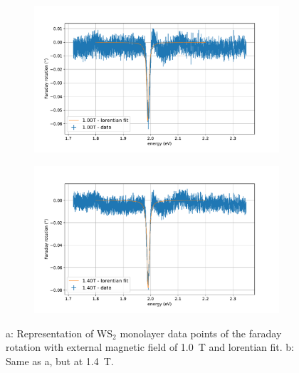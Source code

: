 \begin{figure}[H]
    \centering
    \begin{subfigure}{0.47\textwidth}
        \centering
        \includegraphics[width=1.0\textwidth]{plots/WS2_1000mT.pdf}
    \caption{}
    \end{subfigure}
    \begin{subfigure}{0.47\textwidth}
        \centering
        \includegraphics[width=\textwidth]{plots/WS2_1400mT.pdf}
        \caption{}
    \end{subfigure}
    \caption{a: Representation of WS$_2$ monolayer data points of the faraday rotation with external magnetic field of \SI{1.0}{\tesla} and lorentian fit. b: Same as a, but at \SI{1.4}{\tesla}.} %
\end{figure}
